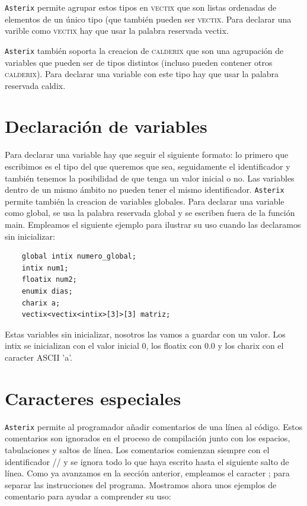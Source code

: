 \documentclass[a4paper, 10pt]{article}
\newcommand{\atx}{\texttt{Asterix} }
\begin{document}
    \atx permite agrupar estos tipos en \textsc{vectix} que son listas ordenadas
    de elementos de un único tipo (que también pueden ser \textsc{vectix}.
    Para declarar una varible como \textsc{vectix} hay que usar la palabra 
    reservada \textsf{vectix}.

    \atx también soporta la creacion de \textsc{calderix} que son una agrupación
    de variables que pueden ser de tipos distintos (incluso pueden contener otros
    \textsc{calderix}). Para declarar una variable con este tipo hay que usar la palabra 
    reservada \textsf{caldix}.

    \section*{Declaración de variables}
    Para declarar una variable hay que seguir el siguiente formato: lo primero
    que escribimos es el tipo del que queremos que sea, seguidamente el identificador
    y también tenemos la posibilidad de que tenga un valor inicial o no. Las variables
    dentro de un mismo ámbito no pueden tener el mismo identificador. \atx permite
    también la creacion de variables globales. Para declarar una variable como 
    global, se usa la palabra reservada \textsf{global} y se escriben fuera de
    la función main. Empleamos el siguiente ejemplo para ilustrar su uso cuando
    las declaramos sin inicializar:

    \begin{verbatim}
    global intix numero_global;
    intix num1;
    floatix num2;
    enumix dias;
    charix a;
    vectix<vectix<intix>[3]>[3] matriz;
    \end{verbatim}


    Estas variables sin inicializar, nosotros las vamos a guardar con un valor.
    Los intix se inicializan con el valor inicial 0, los floatix con 0.0 y los
    charix con el caracter ASCII 'a'.
    

    \section*{Caracteres especiales}
    \atx permite al programador añadir comentarios de una línea al código. Estos
    comentarios son ignorados en el proceso de compilación junto con los espacios,
    tabulaciones y saltos de línea. Los comentarios comienzan siempre con el
    identificador // y se ignora todo lo que haya escrito hasta el siguiente
    salto de línea. Como ya avanzamos en la sección anterior, empleamos el
    caracter \textsc{;} para separar las instrucciones del programa. Mostramos
    ahora unos ejemplos de comentario para ayudar a comprender su uso:
\end{document}
